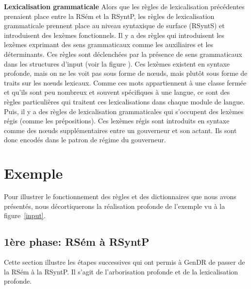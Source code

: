 	
\textbf{Lexicalisation grammaticale}
Alors que les règles de lexicalisation précédentes prenaient place entre la RSém et la RSyntP, les règles de lexicalisation grammaticale prennent place au niveau syntaxique de surface (RSyntS) et introduisent des lexèmes fonctionnels. Il y a des règles qui introduisent les lexèmes exprimant des sens grammaticaux comme les auxiliaires et les déterminants. Ces règles sont déclenchées par la présence de sens grammaticaux dans les structures d'input (voir la figure ). Ces lexèmes existent en syntaxe profonde, mais on ne les voit pas sous forme de n\oe{}uds, mais plutôt sous forme de traits sur les n\oe{}uds lexicaux. Comme ces mots appartiennent à une classe fermée et qu'ils sont peu nombreux et souvent spécifiques à une langue, ce sont des règles particulières qui traitent ces lexicalisations dans chaque module de langue. Puis, il y a des règles de lexicalisation grammaticales qui s'occupent des lexèmes régis (comme les prépositions). Ces lexèmes régis sont introduits en syntaxe comme des n\oe{}uds supplémentaires entre un gouverneur et son actant. Ils sont donc encodés dans le patron de régime du gouverneur.


\section{Exemple}\label{sec:exemple}

Pour illustrer le fonctionnement des règles et des dictionnaires que nous avons présentés, nous décortiquerons la réalisation profonde de l'exemple vu à la figure~\ref{input}.

\subsection{1ère phase: RSém à RSyntP}
Cette section illustre les étapes successives qui ont permis à GenDR de passer de la \ac{RSém} à la \ac{RSyntP}. Il s'agit de l'arborisation profonde et de la lexicalisation profonde.

